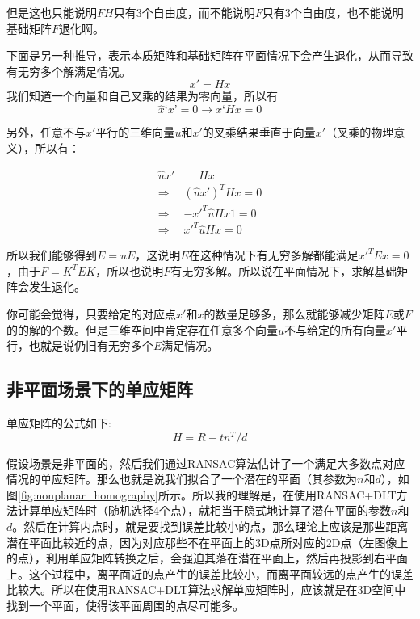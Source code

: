 \begin{note}
但是这也只能说明$FH$只有3个自由度，而不能说明$F$只有3个自由度，也不能说明基础矩阵$F$退化啊。
\end{note}


下面是另一种推导，表示本质矩阵和基础矩阵在平面情况下会产生退化，从而导致有无穷多个解满足情况。
\begin{equation}
	x' = Hx
\end{equation}
我们知道一个向量和自己叉乘的结果为零向量，所以有
\begin{equation}
	\hat{x}‘x’ = 0 \rightarrow \hat{x}‘Hx = 0
\end{equation}

另外，任意不与$x'$平行的三维向量$u$和$x'$的叉乘结果垂直于向量$x'$（叉乘的物理意义），所以有：


\begin{equation}
\begin{split}
\hat{u}x' & \perp Hx \\
 \Rightarrow &  (\hat{u}x')^THx = 0 \\
 \Rightarrow & -x'^T\hat{u}Hx1 = 0 \\
 \Rightarrow & x'^T\hat{u}Hx = 0
\end{split}
\end{equation}


所以我们能够得到$E=\hat{u}E$，这说明$E$在这种情况下有无穷多解都能满足$x'^TEx = 0$，由于$F=K^TEK$，所以也说明$F$有无穷多解。所以说在平面情况下，求解基础矩阵会发生退化。

\begin{note}
你可能会觉得，只要给定的对应点$x'$和$x$的数量足够多，那么就能够减少矩阵$E$或$F$的的解的个数。但是三维空间中肯定存在任意多个向量$u$不与给定的所有向量$x'$平行，也就是说仍旧有无穷多个$E$满足情况。
\end{note}




\subsection{非平面场景下的单应矩阵}
单应矩阵的公式如下:
\begin{equation}
	H = R - tn^T / d
\end{equation}

假设场景是非平面的，然后我们通过RANSAC算法估计了一个满足大多数点对应情况的单应矩阵。那么也就是说我们拟合了一个潜在的平面（其参数为$n$和$d$），如图\ref{fig:nonplanar_homography}所示。所以我的理解是，在使用RANSAC+DLT方法计算单应矩阵时（随机选择4个点），就相当于隐式地计算了潜在平面的参数$n$和$d$。然后在计算内点时，就是要找到误差比较小的点，那么理论上应该是那些距离潜在平面比较近的点，因为对应那些不在平面上的3D点所对应的2D点（左图像上的点），利用单应矩阵转换之后，会强迫其落在潜在平面上，然后再投影到右平面上。这个过程中，离平面近的点产生的误差比较小，而离平面较远的点产生的误差比较大。所以在使用RANSAC+DLT算法求解单应矩阵时，应该就是在3D空间中找到一个平面，使得该平面周围的点尽可能多。


